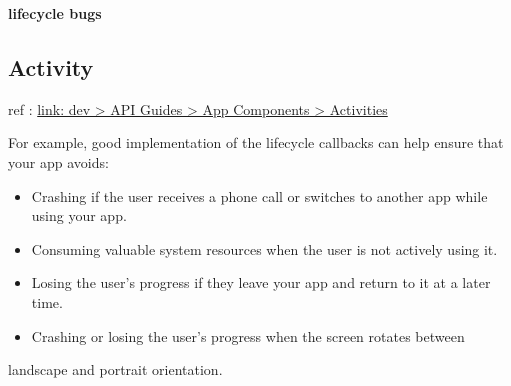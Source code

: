 \documentclass[11pt]{article}
\begin{document}
\textbf{lifecycle bugs}

\subsection{Activity}
\label{sec:orgheadline8}
ref : \href{https://developer.android.com/guide/components/activities/activity-lifecycle.html}{link: dev > API Guides > App Components > Activities}

For example, good implementation of the lifecycle callbacks can help ensure
that your app avoids:
\begin{itemize}
\item Crashing if the user receives a phone call or switches to another app while
using your app.
\item Consuming valuable system resources when the user is not actively using it.
\item Losing the user's progress if they leave your app and return to it at a later
time.
\item Crashing or losing the user's progress when the screen rotates between
\end{itemize}
landscape and portrait orientation.
\end{document}
